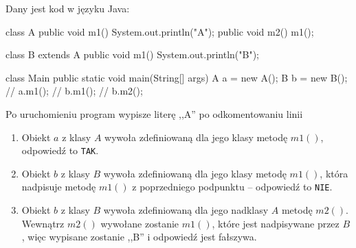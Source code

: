 \begin{exam}
    Dany jest kod w języku Java:
    \begin{java}
        class A {
            public void m1() { System.out.println("A"); }
            public void m2() { m1(); }
        }

        class B extends A {
            public void m1() { System.out.println("B"); }
        }

        class Main {
            public static void main(String[] args) {
                A a = new A();
                B b = new B();
                // a.m1();
                // b.m1();
                // b.m2();
            }
        }
    \end{java}
    Po uruchomieniu program wypisze literę ,,A'' po odkomentowaniu linii
    \answers
    {}
    {}
    {}
    \bigskip

    \begin{enumerate}[\bf A.]
        \item Obiekt $a$ z klasy $A$ wywoła zdefiniowaną dla jego klasy metodę $m1()$, odpowiedź to \texttt{TAK}.

        \item Obiekt $b$ z klasy $B$ wywoła zdefiniowaną dla jego klasy metodę $m1()$, która nadpisuje metodę $m1()$ z poprzedniego podpunktu -- odpowiedź to \texttt{NIE}.

        \item Obiekt $b$ z klasy $B$ wywoła zdefiniowaną dla jego nadklasy $A$ metodę $m2()$. Wewnątrz $m2()$ wywołane zostanie $m1()$, które jest nadpisywane przez $B$, więc wypisane zostanie ,,B'' i odpowiedź jest fałszywa.
    \end{enumerate}
\end{exam}

